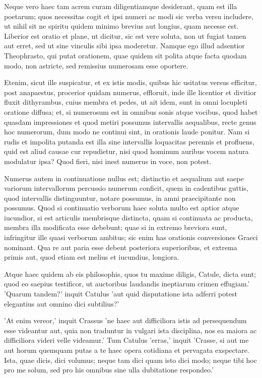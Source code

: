 Neque vero haec tam acrem curam diligentiamque desiderant, quam est illa poetarum; quos necessitas cogit et ipsi numeri ac modi sic verba versu includere, ut nihil sit ne spiritu quidem minimo brevius aut longius, quam necesse est. Liberior est oratio et plane, ut dicitur, sic est vere soluta, non ut fugiat tamen aut erret, sed ut sine vinculis sibi ipsa moderetur. Namque ego illud adsentior Theophrasto, qui putat orationem, quae quidem sit polita atque facta quodam modo, non astricte, sed remissius numerosam esse oportere.

 Etenim, sicut ille suspicatur, et ex istis modis, quibus hic usitatus versus efficitur, post anapaestus, procerior quidam numerus, effloruit, inde ille licentior et divitior fluxit dithyrambus, cuius membra et pedes, ut ait idem, sunt in omni locupleti oratione diffusa; et, si numerosum est in omnibus sonis atque vocibus, quod habet quasdam impressiones et quod metiri possumus intervallis aequalibus, recte genus hoc numerorum, dum modo ne continui sint, in orationis laude ponitur. Nam si rudis et impolita putanda est illa sine intervallis loquacitas perennis et profluens, quid est aliud causae cur repudietur, nisi quod hominum auribus vocem natura modulatur ipsa? Quod fieri, nisi inest numerus in voce, non potest.

 Numerus autem in continuatione nullus est; distinctio et aequalium aut saepe variorum intervallorum percussio numerum conficit, quem in cadentibus guttis, quod intervallis distinguuntur, notare possumus, in amni praecipitante non possumus. Quod si continuatio verborum haec soluta multo est aptior atque iucundior, si est articulis membrisque distincta, quam si continuata ac producta, membra illa modificata esse debebunt; quae si in extremo breviora sunt, infringitur ille quasi verborum ambitus; sic enim has orationis conversiones Graeci nominant. Qua re aut paria esse debent posteriora superioribus, et extrema primis aut, quod etiam est melius et iucundius, longiora.

 Atque haec quidem ab eis philosophis, quos tu maxime diligis, Catule, dicta sunt; quod eo saepius testificor, ut auctoribus laudandis ineptiarum crimen effugiam.' 'Quarum tandem?' inquit Catulus 'aut quid disputatione ista adferri potest elegantius aut omnino dici subtilius?'

 'At enim vereor,' inquit Crassus 'ne haec aut difficiliora istis ad persequendum esse videantur aut, quia non traduntur in vulgari ista disciplina, nos ea maiora ac difficiliora videri velle videamur.' Tum Catulus 'erras,' inquit 'Crasse, si aut me aut horum quemquam putas a te haec opera cotidiana et pervagata exspectare. Ista, quae dicis, dici volumus; neque tam dici quam isto dici modo; neque tibi hoc pro me solum, sed pro his omnibus sine ulla dubitatione respondeo.'

